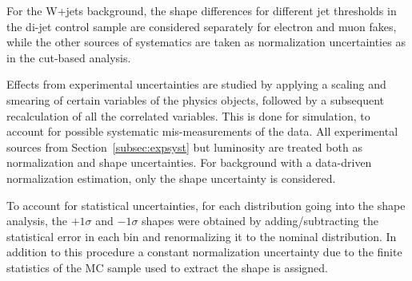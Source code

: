 For the W+jets background, the shape differences for different jet \pt thresholds in the 
di-jet control sample are considered separately for electron and muon fakes, while the
other sources of systematics are taken as normalization uncertainties as in the cut-based
analysis.

Effects from experimental uncertainties are studied by applying a scaling and smearing of certain variables of the physics objects, followed by a subsequent
recalculation of all the correlated variables. This is done for simulation, to account for possible systematic mis-measurements of the data.
All experimental sources from Section~\ref{subsec:expsyst} but luminosity
are treated both as normalization and shape uncertainties.
For background with a data-driven normalization estimation,
only the shape uncertainty is considered.

To account for statistical uncertainties, for each distribution going into the shape analysis, 
the $+1\sigma$ and $-1\sigma$ shapes were obtained by adding/subtracting the statistical error 
in each bin and renormalizing it to the nominal distribution. In addition to this procedure a constant 
normalization uncertainty due to the finite statistics of the MC sample used to extract the shape is assigned.


